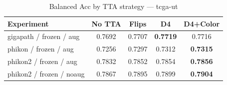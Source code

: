 \begin{table}[ht]
\centering
\caption{Balanced Acc by TTA strategy — tcga-ut}
\begin{tabular}{lcccc}
\toprule
  Experiment & No TTA & Flips & D4 & D4+Color \\
\midrule
  gigapath / frozen / aug & 0.7692 & 0.7707 & \textbf{0.7719} & 0.7716 \\
  phikon / frozen / aug & 0.7256 & 0.7297 & 0.7312 & \textbf{0.7315} \\
  phikon2 / frozen / aug & 0.7832 & 0.7852 & 0.7854 & \textbf{0.7856} \\
  phikon2 / frozen / noaug & 0.7867 & 0.7895 & 0.7899 & \textbf{0.7904} \\
\bottomrule
\end{tabular}
\end{table}